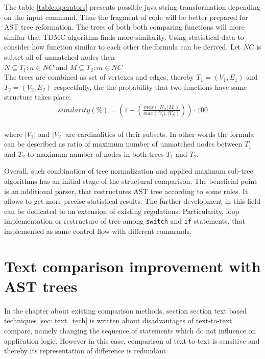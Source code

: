 \documentclass{report}
\begin{document}
The table \ref{table:operators} presents possible java string transformation depending on the input command. Thus the fragment of code will be better prepared for AST tree reformation. The trees of both both comparing functions will more similar that TDMC algorithm finds more similarity. Using statistical data to consider how function similar to each other the formula can be derived. Let $NC$ is subset all of unmatched nodes then\\
$ N \subseteq T_{1}: n \in NC $ and $ M \subseteq T_{2}: m \in NC $ \\
The trees are combined as set of vertexes and edges, thereby $T_{1} = (V_{1}, E_{1})$ and $T_{2} = (V_{2}, E_{2})$ respectfully, the the probability that two functions have same structure takes place: \\
\begin{gather*}
similarity(\%) =  \left ( 1 - \left (\frac{max(|N|, |M|)}{max(|V_{1}|, |V_{2}|)} \right ) \right )\cdot 100 
\end{gather*} \\
where $|V_{1}|$ and $|V_{2}|$ are cardinalities of their subsets. In other words the formula can be described as ratio of maximum number of unmatched nodes between $T_{1}$ and $T_{2}$ to maximum number of nodes in both trees $T_{1}$ and $T_{2}$. 

Overall, such combination of tree normalization and applied maximum sub-tree algorithms has an initial stage of the structural comparison. The beneficial point is an additional parser, that restructures AST tree according to some rules. It allows to get more precise statistical results. The further development in this field can be dedicated to an extension of existing regulations. Particularity, loop implementation or restructure of tree among \texttt{switch} and \texttt{if} statements, that implemented as same control flow with different commands. 


\chapter{Text comparison improvement with AST trees}
\label{sec:text-improvement}

In the chapter about existing comparison methods, section section text based techniques \ref{sec: text_tech} is written about disadvantages of text-to-text compare, namely changing the sequence of statements which do not influence on application logic. However in this case, comparison of text-to-text is sensitive  and thereby its representation of difference is redundant.
\end{document}
